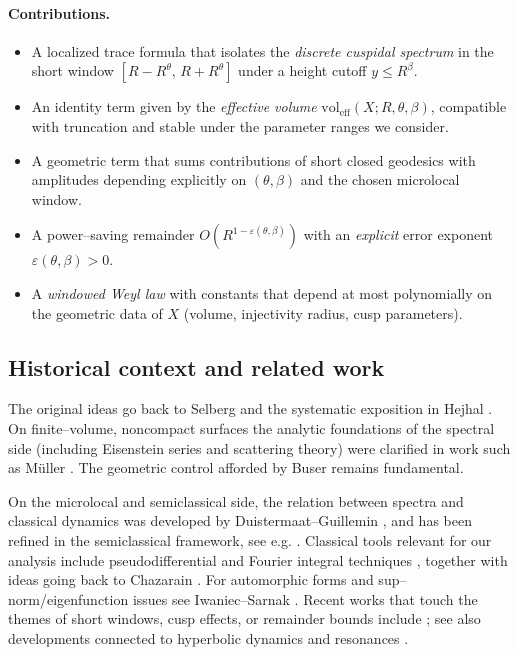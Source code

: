 \paragraph{Contributions.}
\begin{itemize}
  \item A localized trace formula that isolates the \emph{discrete cuspidal spectrum} in
        the short window $[R-R^\theta,\,R+R^\theta]$ under a height cutoff $y\le R^\beta$.
  \item An identity term given by the \emph{effective volume} $\mathrm{vol}_{\mathrm{eff}}(X;R,\theta,\beta)$,
        compatible with truncation and stable under the parameter ranges we consider.
  \item A geometric term that sums contributions of short closed geodesics with amplitudes
        depending explicitly on $(\theta,\beta)$ and the chosen microlocal window.
  \item A power--saving remainder $O(R^{1-\varepsilon(\theta,\beta)})$ with an
        \emph{explicit} error exponent $\varepsilon(\theta,\beta)>0$.
  \item A \emph{windowed Weyl law} with constants that depend at most polynomially on the
        geometric data of $X$ (volume, injectivity radius, cusp parameters).
\end{itemize}

\subsection{Historical context and related work}\label{subsec:history}
The original ideas go back to Selberg \cite{selberg1956} and the systematic exposition in
Hejhal \cite{hejhal1976,hejhal1983}. On finite--volume, noncompact surfaces the analytic
foundations of the spectral side (including Eisenstein series and scattering theory) were
clarified in work such as M\"uller \cite{mueller1983}. The geometric control afforded by
Buser \cite{buser1992} remains fundamental.

On the microlocal and semiclassical side, the relation between spectra and classical
dynamics was developed by Duistermaat--Guillemin \cite{duistermaatguillemin1975}, and
has been refined in the semiclassical framework, see e.g.
\cite{zworski2012,dyatlovzworski2019}. Classical tools relevant for our analysis include
pseudodifferential and Fourier integral techniques \cite{hormander1994III,sogge1993},
together with ideas going back to Chazarain \cite{chazarain1974}. For automorphic forms
and sup--norm/eigenfunction issues see Iwaniec--Sarnak \cite{iwaniec1995}. Recent works
that touch the themes of short windows, cusp effects, or remainder bounds include
\cite{canzanigalkowski2019,deleporte2024,gansemer2024,le_masson2024,zhuwu2024}; see also
developments connected to hyperbolic dynamics and resonances
\cite{dyatlov2018,dyatlov2019,danetel2018}.

